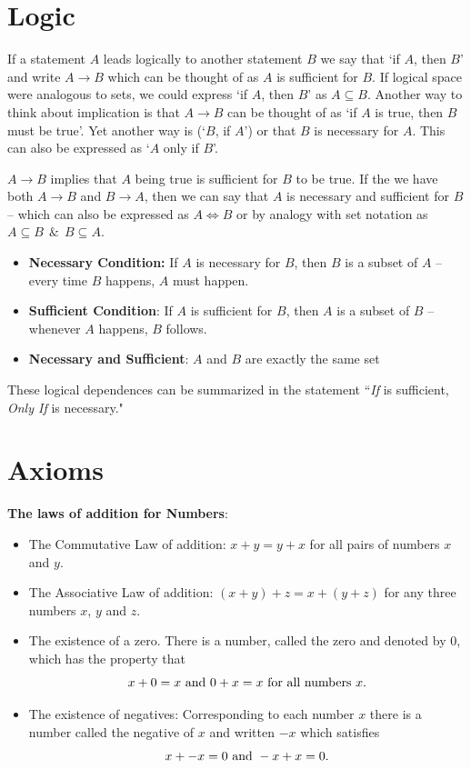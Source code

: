 \section{Logic}

\begin{definition}
If a statement $A$ leads logically to another statement $B$ we say that `if $A$, then $B$' and write $A \rightarrow B$ which can be thought of as $A$ is {\twelveit sufficient } for $B$. If logical space were analogous to sets, we could express 
`if $A$, then $B$'  as $A\subseteq B$. Another way to think about implication is that $A\rightarrow B$ can be thought of as `if $A$ is true, then $B$ must be true'. Yet another way is (`$B$, if $A$') or that $B$ is {\twelveit necessary} for $A$. This can also be expressed as `$A$ {\twelveit only if} $B$'.
\end{definition}

$A\rightarrow B$ implies that $A$ being true is sufficient for $B$ to be true. If the we have both $A\rightarrow B$ and $B\rightarrow A$, then we can say that $A$ is {\twelveit necessary and sufficient} for $B$ -- which can also be expressed as $A \iff B$ or by analogy with set notation as  $A\subseteq B ~~\&~~ B \subseteq A$.

\begin{itemize}
\item[]{\bf Necessary Condition:} If $A$ is necessary for $B$, then $B$ is a subset of $A$ -- every time $B$ happens, $A$ must happen.
\item[]{\bf Sufficient Condition}: If $A$ is sufficient for $B$, then $A$ is a subset of $B$ -- whenever $A$ happens, $B$ follows. 
\item[]{\bf Necessary and Sufficient}:  $A$ and $B$ are exactly the same set
\end{itemize}

These logical dependences can be summarized in the statement ``{\it If} is  sufficient, {\it Only If} is necessary." 

\section{Axioms}

\begin{definition}{\bf The laws of addition for Numbers}:

\begin{itemize}
\item[A1:] The Commutative Law of addition: $x+ y = y + x$ for all pairs of numbers $x$ and $y$.
\item[A2:] The Associative Law of addition: $(x+y) + z = x + (y+z)$ for any three numbers $x$, $y$ and $z$.
\item[A3:] The existence of a zero. There is a number, called the zero and denoted by $0$, which has the property that
$$ x + 0 = x \hbox{~and~} 0 + x = x \hbox{~for all numbers~} x.$$
\item[A4:] The existence of negatives: Corresponding to each number $x$ there is a number called the negative of $x$ and written $-x$ which satisfies
$$x + -x = 0\hbox{~and~} -x + x = 0.$$
\end{itemize}
\end{definition}

